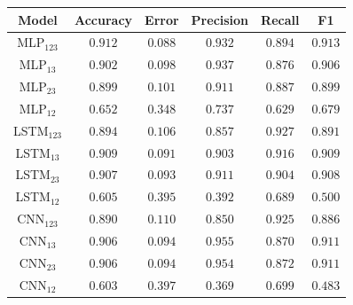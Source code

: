 \documentclass[a4paper,fleqn]{cas-sc}
\begin{document}
\hfill
\begin{minipage}{0.45\textwidth}
	\vspace{0.5cm}
	\begingroup
	\begin{tiny}	
		\setlength{\tabcolsep}{3pt}
		\renewcommand{\arraystretch}{1.15}
		
		
		\begin{tabular*}{\textwidth}{@{} CCCCCC@{} }
			\toprule
			Model&Accuracy&Error&Precision&Recall&F1 \\
			\midrule
				MLP$_{123}$ & $0.912$ & $0.088$ & $0.932$ & $0.894$ & $0.913$ \\
				MLP$_{13}$ & $0.902$ & $0.098$ & $0.937$ & $0.876$ & $0.906$ \\
				MLP$_{23}$ & $0.899$ & $0.101$ & $0.911$ & $0.887$ & $0.899$ \\
				MLP$_{12}$ & $0.652$ & $0.348$ & $0.737$ & $0.629$ & $0.679$ \\
				LSTM$_{123}$ & $0.894$ & $0.106$ & $0.857$ & $0.927$ & $0.891$ \\
				LSTM$_{13}$ & $0.909$ & $0.091$ & $0.903$ & $0.916$ & $0.909$ \\
				LSTM$_{23}$ & $0.907$ & $0.093$ & $0.911$ & $0.904$ & $0.908$ \\
				LSTM$_{12}$ & $0.605$ & $0.395$ & $0.392$ & $0.689$ & $0.500$ \\
				CNN$_{123}$ & $0.890$ & $0.110$ & $0.850$ & $0.925$ & $0.886$ \\
				CNN$_{13}$ & $0.906$ & $0.094$ & $0.955$ & $0.870$ & $0.911$ \\
				CNN$_{23}$ & $0.906$ & $0.094$ & $0.954$ & $0.872$ & $0.911$ \\
				CNN$_{12}$ & $0.603$ & $0.397$ & $0.369$ & $0.699$ & $0.483$ \\    		
			\bottomrule
		\end{tabular*}
		\vspace{-0.3cm}
		\label{tab:metricas_500Mbps_teste}
	\end{tiny}
	\endgroup
\end{minipage}
\hfill
\end{document}
